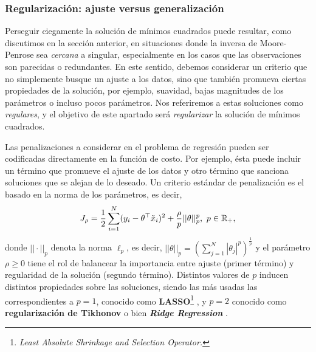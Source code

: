 \subsubsection{Regularización: ajuste versus generalización} %
\label{sub:min_cuad_reg}

Perseguir ciegamente la solución de mínimos cuadrados puede resultar, como discutimos en la sección anterior, en situaciones donde la inversa de Moore-Penrose sea \emph{cercana} a singular, especialmente en los casos que las observaciones son parecidas o redundantes. En este sentido, debemos considerar un criterio que no simplemente busque un ajuste a los datos, sino que también promueva ciertas propiedades de la solución, por ejemplo, suavidad, bajas magnitudes de los parámetros o incluso pocos parámetros. Nos referiremos a estas soluciones como \emph{regulares}, y el objetivo de este apartado será \emph{regularizar} la solución de mínimos cuadrados.

Las penalizaciones a considerar en el problema de regresión pueden ser codificadas directamente en la función de costo. Por ejemplo, ésta puede incluir un término que promueve el ajuste de los datos y otro término que sanciona soluciones que se alejan de lo deseado. Un criterio estándar de penalización es el basado en la norma de los parámetros, es decir, 
\begin{equation}
	J_\rho = \frac{1}{2}\sum_{i=1}^N(y_i-\theta^
	\top \tilde{x}_i)^2 + \frac{\rho}{p}||\theta||_p^p,\ p\in{\mathbb R}_+,
	\label{eq:reg_least_squares}
\end{equation} 
donde $||\cdot||_p$ denota la norma $\ell_p$, es decir, $||\theta||_p=\left(\sum_{j=1}^N|\theta_j|^p\right)^\frac{1}{p}$ y el parámetro $\rho\geq0$ tiene el rol de balancear la importancia entre ajuste (primer término) y regularidad de la solución (segundo término). Distintos valores de $p$ inducen distintos propiedades sobre las soluciones, siendo las más usadas las correspondientes a $p=1$, conocido como \textbf{LASSO}\footnote{\emph{Least Absolute Shrinkage and Selection Operator.}} \cite{tibshirani_1996}, y $p=2$ conocido como \textbf{regularización de Tikhonov} \cite{tikhonov_arsenin_1977} o bien \textbf{\emph{Ridge Regression}} \cite{hoerl_kennard_1970}.  

